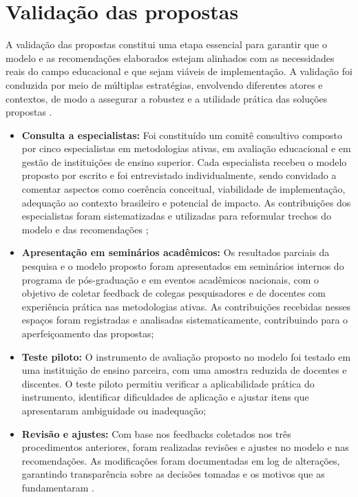 \section{Validação das propostas}
\label{sec:validacao_propostas}

A validação das propostas constitui uma etapa essencial para garantir que o modelo e as recomendações elaborados estejam alinhados com as necessidades reais do campo educacional e que sejam viáveis de implementação. A validação foi conduzida por meio de múltiplas estratégias, envolvendo diferentes atores e contextos, de modo a assegurar a robustez e a utilidade prática das soluções propostas \cite{CRESWELL2018}.

\begin{itemize}
    \item \textbf{Consulta a especialistas:} Foi constituído um comitê consultivo composto por cinco especialistas em metodologias ativas, em avaliação educacional e em gestão de instituições de ensino superior. Cada especialista recebeu o modelo proposto por escrito e foi entrevistado individualmente, sendo convidado a comentar aspectos como coerência conceitual, viabilidade de implementação, adequação ao contexto brasileiro e potencial de impacto. As contribuições dos especialistas foram sistematizadas e utilizadas para reformular trechos do modelo e das recomendações \cite{SANTOS2024};
    \item \textbf{Apresentação em seminários acadêmicos:} Os resultados parciais da pesquisa e o modelo proposto foram apresentados em seminários internos do programa de pós-graduação e em eventos acadêmicos nacionais, com o objetivo de coletar feedback de colegas pesquisadores e de docentes com experiência prática nas metodologias ativas. As contribuições recebidas nesses espaços foram registradas e analisadas sistematicamente, contribuindo para o aperfeiçoamento das propostas;
    \item \textbf{Teste piloto:} O instrumento de avaliação proposto no modelo foi testado em uma instituição de ensino parceira, com uma amostra reduzida de docentes e discentes. O teste piloto permitiu verificar a aplicabilidade prática do instrumento, identificar dificuldades de aplicação e ajustar itens que apresentaram ambiguidade ou inadequação;
    \item \textbf{Revisão e ajustes:} Com base nos feedbacks coletados nos três procedimentos anteriores, foram realizadas revisões e ajustes no modelo e nas recomendações. As modificações foram documentadas em log de alterações, garantindo transparência sobre as decisões tomadas e os motivos que as fundamentaram \cite{BARDIN2016}.
\end{itemize}


